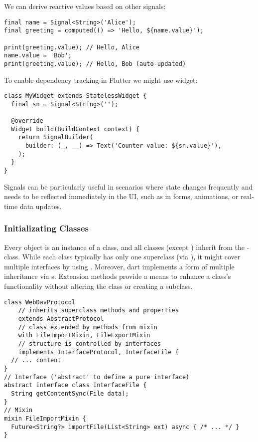 \noindent We can derive reactive values based on other signals:

\begin{lstlisting}
final name = Signal<String>('Alice');
final greeting = computed(() => 'Hello, ${name.value}');

print(greeting.value); // Hello, Alice
name.value = 'Bob';
print(greeting.value); // Hello, Bob (auto-updated)
\end{lstlisting}

\noindent To enable dependency tracking in Flutter we might use  widget:

\begin{lstlisting}
class MyWidget extends StatelessWidget {
  final sn = Signal<String>('');

  @override
  Widget build(BuildContext context) {
    return SignalBuilder(
      builder: (_, __) => Text('Counter value: ${sn.value}'),
    );
  }
}
\end{lstlisting}

\noindent Signals can be particularly useful in scenarios where state changes frequently and needs to be reflected
immediately in the UI, such as in forms, animations, or real-time data updates.


\subsubsection{Initializating Classes}

Every object is an instance of a class, and all classes (except ) inherit from the -class. While each
class typically has only one superclass (via ), it might cover multiple interfaces by using .
Moreover, dart implements a form of multiple inheritance via s. Extension methods provide a means to
enhance a class's functionality without altering the class or creating a subclass.

\begin{lstlisting}
class WebDavProtocol
    // inherits superclass methods and properties
    extends AbstractProtocol
    // class extended by methods from mixin
    with FileImportMixin, FileExportMixin
    // structure is controlled by interfaces
    implements InterfaceProtocol, InterfaceFile {
  // ... content
}
// Interface ('abstract' to define a pure interface)
abstract interface class InterfaceFile {
  String getContentSync(File data);
}
// Mixin
mixin FileImportMixin {
  Future<String?> importFile(List<String> ext) async { /* ... */ }
}
\end{lstlisting}

